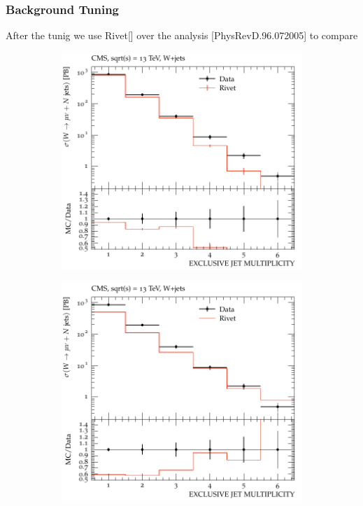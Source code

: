 \documentclass{beamer}
\begin{document}
\begin{frame}
\frametitle{Background Tuning}
After the tunig we use Rivet[] over the analysis [PhysRevD.96.072005] to compare 

\begin{figure}[!h]

	\begin{subfigure}[b]{0.44\textwidth}
		\centering
		\includegraphics[width=\textwidth]{pictures/MCTunig/EXCLUSIVE_JET_MULTIPLICITY}
		\caption{\label{EXCLUSIVE_JET_MULTIPLICITYTune}}
	\end{subfigure}
	\begin{subfigure}[b]{0.44\textwidth}
		\centering
		\includegraphics[width=\textwidth]{pictures/MCTunig/EXCLUSIVE_JET_MULTIPLICITY_Nelson}

\end{subfigure}
\end{figure}
\end{frame}
\end{document}
